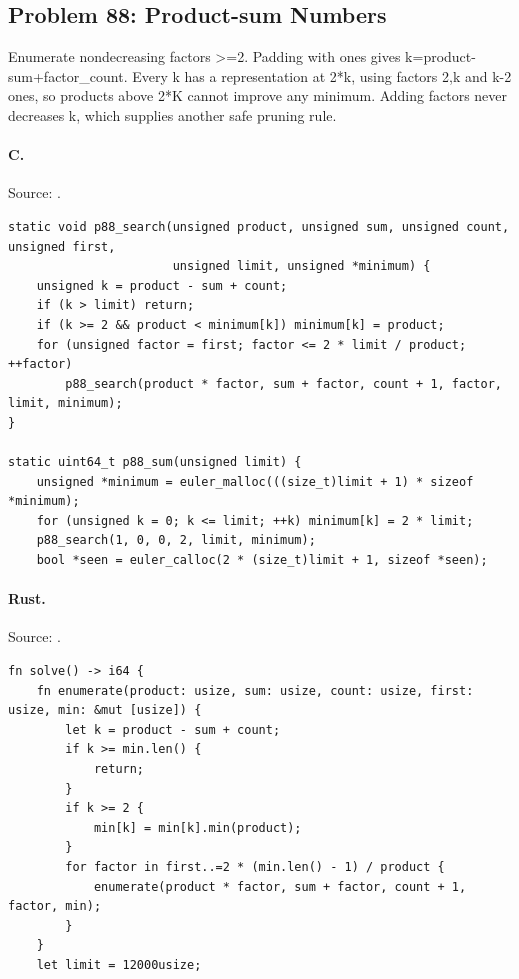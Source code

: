 \subsection{Problem 88: Product-sum Numbers}
\label{walkthrough:p88}
Enumerate nondecreasing factors >=2. Padding with ones gives k=product-sum+factor\_count. Every k has a representation at 2*k, using factors 2,k and k-2 ones, so products above 2*K cannot improve any minimum. Adding factors never decreases k, which supplies another safe pruning rule.

\paragraph{C.} Source: .
\begin{lstlisting}
static void p88_search(unsigned product, unsigned sum, unsigned count, unsigned first,
                       unsigned limit, unsigned *minimum) {
    unsigned k = product - sum + count;
    if (k > limit) return;
    if (k >= 2 && product < minimum[k]) minimum[k] = product;
    for (unsigned factor = first; factor <= 2 * limit / product; ++factor)
        p88_search(product * factor, sum + factor, count + 1, factor, limit, minimum);
}

static uint64_t p88_sum(unsigned limit) {
    unsigned *minimum = euler_malloc(((size_t)limit + 1) * sizeof *minimum);
    for (unsigned k = 0; k <= limit; ++k) minimum[k] = 2 * limit;
    p88_search(1, 0, 0, 2, limit, minimum);
    bool *seen = euler_calloc(2 * (size_t)limit + 1, sizeof *seen);
\end{lstlisting}

\paragraph{Rust.} Source: .
\begin{lstlisting}
fn solve() -> i64 {
    fn enumerate(product: usize, sum: usize, count: usize, first: usize, min: &mut [usize]) {
        let k = product - sum + count;
        if k >= min.len() {
            return;
        }
        if k >= 2 {
            min[k] = min[k].min(product);
        }
        for factor in first..=2 * (min.len() - 1) / product {
            enumerate(product * factor, sum + factor, count + 1, factor, min);
        }
    }
    let limit = 12000usize;
\end{lstlisting}

